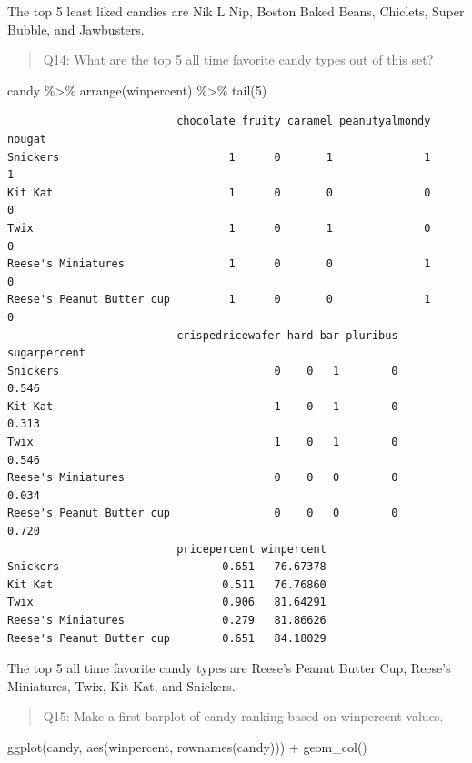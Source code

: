 \documentclass[
  letterpaper,
  DIV=11,
  numbers=noendperiod]{scrartcl}
\newenvironment{Shaded}{\begin{snugshade}}{\end{snugshade}}
\newcommand{\DecValTok}[1]{\textcolor[rgb]{0.68,0.00,0.00}{#1}}
\newcommand{\FunctionTok}[1]{\textcolor[rgb]{0.28,0.35,0.67}{#1}}
\newcommand{\NormalTok}[1]{\textcolor[rgb]{0.00,0.23,0.31}{#1}}
\newcommand{\SpecialCharTok}[1]{\textcolor[rgb]{0.37,0.37,0.37}{#1}}
\begin{document}
The top 5 least liked candies are Nik L Nip, Boston Baked Beans,
Chiclets, Super Bubble, and Jawbusters.

\begin{quote}
Q14: What are the top 5 all time favorite candy types out of this set?
\end{quote}

\begin{Shaded}
\begin{Highlighting}[]
\NormalTok{candy }\SpecialCharTok{\%\textgreater{}\%}
  \FunctionTok{arrange}\NormalTok{(winpercent) }\SpecialCharTok{\%\textgreater{}\%}
  \FunctionTok{tail}\NormalTok{(}\DecValTok{5}\NormalTok{)}
\end{Highlighting}
\end{Shaded}

\begin{verbatim}
                          chocolate fruity caramel peanutyalmondy nougat
Snickers                          1      0       1              1      1
Kit Kat                           1      0       0              0      0
Twix                              1      0       1              0      0
Reese's Miniatures                1      0       0              1      0
Reese's Peanut Butter cup         1      0       0              1      0
                          crispedricewafer hard bar pluribus sugarpercent
Snickers                                 0    0   1        0        0.546
Kit Kat                                  1    0   1        0        0.313
Twix                                     1    0   1        0        0.546
Reese's Miniatures                       0    0   0        0        0.034
Reese's Peanut Butter cup                0    0   0        0        0.720
                          pricepercent winpercent
Snickers                         0.651   76.67378
Kit Kat                          0.511   76.76860
Twix                             0.906   81.64291
Reese's Miniatures               0.279   81.86626
Reese's Peanut Butter cup        0.651   84.18029
\end{verbatim}

The top 5 all time favorite candy types are Reese's Peanut Butter Cup,
Reese's Miniatures, Twix, Kit Kat, and Snickers.

\begin{quote}
Q15: Make a first barplot of candy ranking based on winpercent values.
\end{quote}

\begin{Shaded}
\begin{Highlighting}[]
\FunctionTok{ggplot}\NormalTok{(candy, }\FunctionTok{aes}\NormalTok{(winpercent, }\FunctionTok{rownames}\NormalTok{(candy))) }\SpecialCharTok{+}
  \FunctionTok{geom\_col}\NormalTok{()}
\end{Highlighting}
\end{Shaded}
\end{document}
